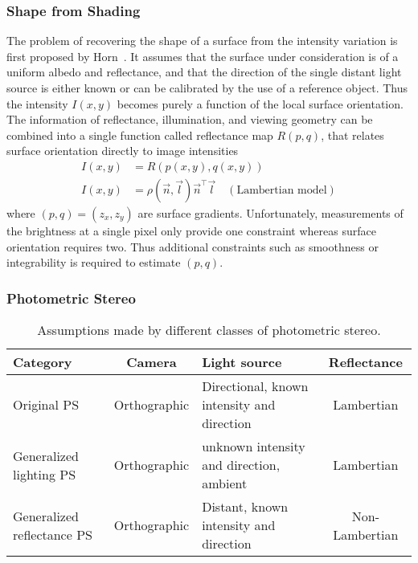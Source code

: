 \subsubsection{Shape from Shading}
The problem of recovering the shape of a surface from the intensity variation is first proposed by Horn~\cite{horn1970shape}. It assumes that the surface under consideration is of a uniform albedo and reflectance, and that the direction of the single distant light source is either known or can be calibrated by the use of a reference object. Thus the intensity $I(x,y)$ becomes purely a function of the local surface orientation. The information of reflectance, illumination, and viewing geometry can be combined into a single function called reflectance map $R(p, q)$, that relates surface orientation directly to image intensities
\begin{align*}
I(x, y) &= R(p(x, y), q(x, y))\\
I(x, y) &= \rho(\vec{n},\vec{l})\vec{n}^\top\vec{l} \quad (\text{Lambertian model})
\end{align*}
where $(p, q) = (z_x, z_y)$ are surface gradients. Unfortunately, measurements of the brightness at a single pixel only provide one constraint whereas surface orientation requires two. Thus additional constraints such as smoothness or integrability is required to estimate $(p, q)$.

\subsubsection{Photometric Stereo}
\begin{table}[h]
  \centering
  \begin{tabular}{p{2cm}|cp{4cm}c}
  \toprule
  \textbf{Category} & Camera & Light source & Reflectance \\
  \midrule
  Original PS & Orthographic & Directional, known intensity and direction & Lambertian \\
  Generalized lighting PS & Orthographic & unknown intensity and direction, ambient & Lambertian \\
  Generalized reflectance PS & Orthographic & Distant, known intensity and direction & Non-Lambertian \\
  \bottomrule
  \end{tabular}
  \caption{Assumptions made by different classes of photometric stereo.}
  \label{tab:ps_assumptions}
\end{table}

